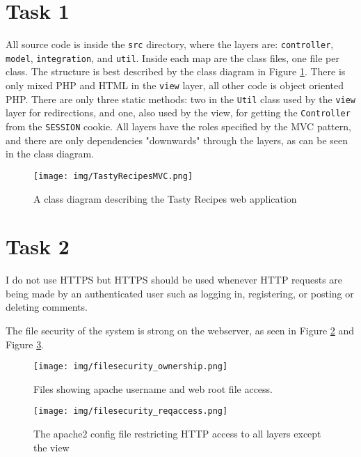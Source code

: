 \documentclass[a4paper]{scrreprt}
\newcommand{\code}[1]{\texttt{#1}}
\begin{document}
\section{Task 1}

All source code is inside the \code{src} directory, where the layers are: \code{controller}, \code{model}, \code{integration}, and \code{util}. Inside each map are the class files, one file per class. The structure is best described by the class diagram in Figure \ref{fig:classdia}. There is only mixed PHP and HTML in the \code{view} layer, all other code is object oriented PHP. There are only three static methods: two in the \code{Util} class used by the \code{view} layer for redirections, and one, also used by the view, for getting the \code{Controller} from the \code{SESSION} cookie. All layers have the roles specified by the MVC pattern, and there are only dependencies "downwards" through the layers, as can be seen in the class diagram.

\begin{figure}[h!]
  \begin{center}
    \texttt{[image: img/TastyRecipesMVC.png]}
    \caption{A class diagram describing the Tasty Recipes web application}
    \label{fig:classdia}
  \end{center}
\end{figure}

\section{Task 2}
I do not use HTTPS but HTTPS should be used whenever HTTP requests are being made by an authenticated user such as logging in, registering, or posting or deleting comments.

The file security of the system is strong on the webserver, as seen in Figure \ref{fig:ownership} and Figure \ref{fig:reqaccess}.

\begin{figure}[h!]
  \begin{center}
    \texttt{[image: img/filesecurity\_ownership.png]}
    \caption{Files showing apache username and web root file access.}
    \label{fig:ownership}
  \end{center}
\end{figure}

\begin{figure}[h!]
  \begin{center}
    \texttt{[image: img/filesecurity\_reqaccess.png]}
    \caption{The apache2 config file restricting HTTP access to all layers except the view}
    \label{fig:reqaccess}
  \end{center}
\end{figure}
\end{document}
